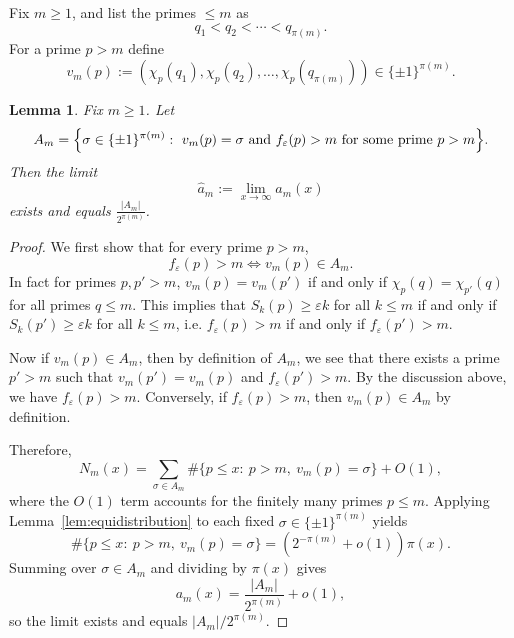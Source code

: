\documentclass[11pt,letterpaper,reqno]{amsart}
\newtheorem{lemma}[theorem]{Lemma}
\theoremstyle{definition}
\numberwithin{equation}{section}
\newcommand{\1}{\mathbf{1}}
\begin{document}
Fix $m\ge 1$, and list the primes $\le m$ as
\[
q_1<q_2<\cdots<q_{\pi(m)}.
\]
For a prime $p>m$ define
\[
v_m(p):=\left(\chi_p(q_1),\chi_p(q_2),\dots,\chi_p(q_{\pi(m)})\right)\in\{\pm1\}^{\pi(m)}.
\]



\begin{lemma}\label{lem:qm-exists}
Fix $m\ge 1$. Let
\[
A_m=\Bigl\{\sigma\in \{\pm 1\}^{\pi(m)}:\ v_m(p)=\sigma \text{ and } f_{\varepsilon}(p)>m \text{ for some prime } p>m\Bigr\}.
\]
Then the limit
\begin{equation}\label{eq:qm-def}
\widehat{a}_m:=\lim_{x\to\infty}a_m(x)
\end{equation}
exists and equals $\frac{|A_m|}{2^{\pi(m)}}$.
\end{lemma}

\begin{proof}
    We first show that for every prime $p>m$,
\[
f_{\varepsilon}(p)>m\iff v_m(p)\in A_m.
\]
In fact for primes $p,p'>m$, $v_m(p)=v_m(p')$ if and only if $\chi_p(q)=\chi_{p'}(q)$ for all primes $q\leq m$. This implies that $S_k(p)\geq \varepsilon k$ for all $k\leq m$ if and only if $S_k(p')\geq \varepsilon k$ for all $k\leq m$, i.e. $f_{\varepsilon}(p)>m$ if and only if $f_{\varepsilon}(p')>m$.

Now if $v_m(p)\in A_m$, then by definition of $A_m$, we see that there exists a prime $p'>m$ such that $v_m(p')=v_m(p)$ and $f_{\varepsilon}(p')>m$. By the discussion above, we have $f_{\varepsilon}(p)>m$. Conversely, if $f_{\varepsilon}(p)>m$, then $v_m(p)\in A_m$ by definition.





Therefore,
\[
N_m(x)=\sum_{\sigma\in A_m}\#\{p\le x:\ p>m,\ v_m(p)=\sigma\}+O(1),
\]
where the $O(1)$ term accounts for the finitely many primes $p\le m$.
Applying Lemma~\ref{lem:equidistribution}  to each fixed
$\sigma\in\{\pm1\}^{\pi(m)}$ yields
\[
\#\{p\le x:\ p>m,\ v_m(p)=\sigma\}
=\left(2^{-\pi(m)}+o(1)\right)\pi(x).
\]
Summing over $\sigma\in A_{m}$ and dividing by $\pi(x)$ gives
\[
a_{m}(x)=\frac{|A_{m}|}{2^{\pi(m)}}+o(1),
\]
so the limit exists and equals $|A_{m}|/2^{\pi(m)}$.
\end{proof}
\end{document}
